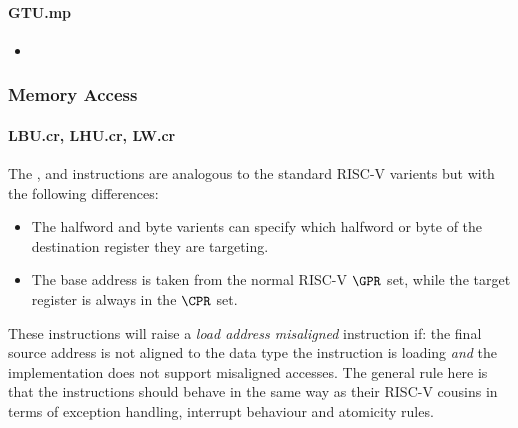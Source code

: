 \paragraph{GTU.mp}

\begin{itemize}
\item {}
\end{itemize}

\subsubsection{Memory Access}

\paragraph{LBU.cr, LHU.cr, LW.cr}

The ,  and  instructions are analogous to
the standard RISC-V varients but with the following differences:

\begin{itemize}
\item The halfword and byte varients can specify which halfword or byte of
      the destination register they are targeting.
\item The base address is taken from the normal RISC-V $\GPR$ set, while the
      target register is always in the $\CPR$ set.
\end{itemize}

These instructions will raise a {\em load address misaligned} instruction
if: the final source address is not aligned to the data type the instruction
is loading {\em and} the implementation does not support misaligned accesses.
The general rule here is that the  instructions should behave in
the same way as their RISC-V cousins in terms of exception handling,
interrupt behaviour and atomicity rules.

